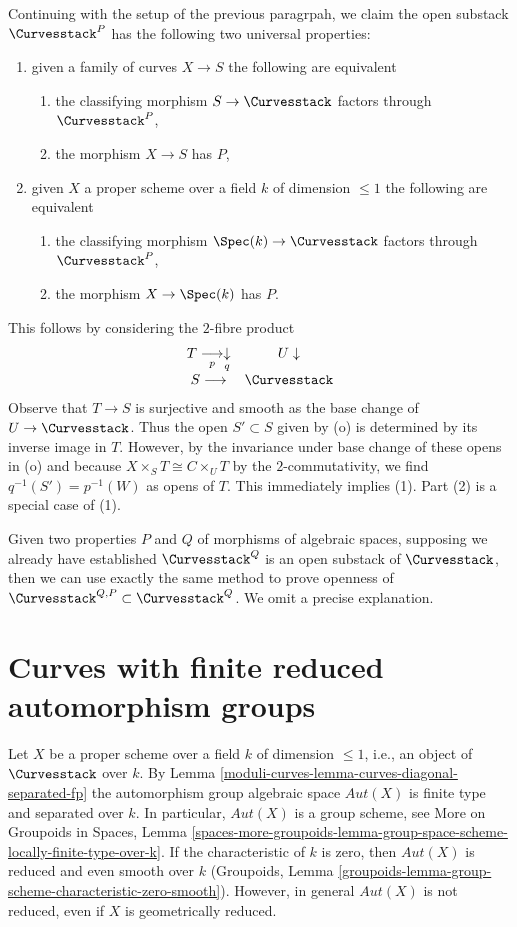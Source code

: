 \medskip\noindent
Continuing with the setup of the previous paragrpah, we claim
the open substack $\Curvesstack^P$ has the following two universal properties:
\begin{enumerate}
\item given a family of curves $X \to S$ the following are equivalent
\begin{enumerate}
\item the classifying morphism $S \to \Curvesstack$ factors through
$\Curvesstack^P$,
\item the morphism $X \to S$ has $P$,
\end{enumerate}
\item given $X$ a proper scheme over a field $k$ of dimension $\leq 1$
the following are equivalent
\begin{enumerate}
\item the classifying morphism $\Spec(k) \to \Curvesstack$ factors
through $\Curvesstack^P$,
\item the morphism $X \to \Spec(k)$ has $P$.
\end{enumerate}
\end{enumerate}
This follows by considering the $2$-fibre product
$$
\begin{array}{cc}T \underset{p}{\longrightarrow}\underset{q}{\downarrow} & U \downarrow \\ S \longrightarrow & \Curvesstack\end{array}
$$
Observe that $T \to S$ is surjective and smooth as the base
change of $U \to \Curvesstack$. Thus the open $S' \subset S$
given by (o) is determined by its inverse image in $T$.
However, by the invariance under base change of these opens in (o)
and because $X \times_S T \cong C \times_U T$ by the $2$-commutativity,
we find $q^{-1}(S') = p^{-1}(W)$ as opens of $T$.
This immediately implies (1). Part (2) is a special case of (1).

\medskip\noindent
Given two properties $P$ and $Q$ of morphisms of algebraic spaces,
supposing we already have established $\Curvesstack^Q$ is
an open substack of $\Curvesstack$, then we can use exactly
the same method to prove openness of
$\Curvesstack^{Q, P} \subset \Curvesstack^Q$.
We omit a precise explanation.

\section{Curves with finite reduced automorphism groups}
\label{moduli-curves-section-finite-aut}
Let $X$ be a proper scheme over a field $k$ of dimension $\leq 1$, i.e.,
an object of $\Curvesstack$ over $k$.
By Lemma \ref{moduli-curves-lemma-curves-diagonal-separated-fp}
the automorphism group algebraic space $\mathit{Aut}(X)$
is finite type and separated over $k$.
In particular, $\mathit{Aut}(X)$ is a group scheme, see
More on Groupoids in Spaces, Lemma
\ref{spaces-more-groupoids-lemma-group-space-scheme-locally-finite-type-over-k}.
If the characteristic of $k$ is zero, then $\mathit{Aut}(X)$
is reduced and even smooth over $k$ (Groupoids, Lemma
\ref{groupoids-lemma-group-scheme-characteristic-zero-smooth}).
However, in general $\mathit{Aut}(X)$ is not reduced, even
if $X$ is geometrically reduced.


